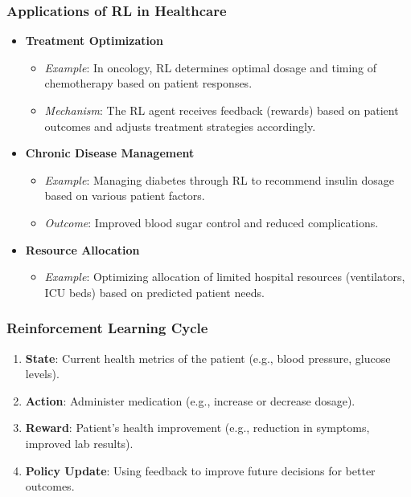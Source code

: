 \documentclass[aspectratio=169]{beamer}
\begin{document}
\begin{frame}[fragile]
  \frametitle{Applications of RL in Healthcare}
  \begin{itemize}
    \item \textbf{Treatment Optimization}
      \begin{itemize}
        \item \textit{Example}: In oncology, RL determines optimal dosage and timing of chemotherapy based on patient responses.
        \item \textit{Mechanism}: The RL agent receives feedback (rewards) based on patient outcomes and adjusts treatment strategies accordingly.
      \end{itemize}
    
    \item \textbf{Chronic Disease Management}
      \begin{itemize}
        \item \textit{Example}: Managing diabetes through RL to recommend insulin dosage based on various patient factors.
        \item \textit{Outcome}: Improved blood sugar control and reduced complications.
      \end{itemize}
    
    \item \textbf{Resource Allocation}
      \begin{itemize}
        \item \textit{Example}: Optimizing allocation of limited hospital resources (ventilators, ICU beds) based on predicted patient needs.
      \end{itemize}
  \end{itemize}
\end{frame}

\begin{frame}[fragile]
  \frametitle{Reinforcement Learning Cycle}
  \begin{enumerate}
    \item \textbf{State}: Current health metrics of the patient (e.g., blood pressure, glucose levels).
    \item \textbf{Action}: Administer medication (e.g., increase or decrease dosage).
    \item \textbf{Reward}: Patient's health improvement (e.g., reduction in symptoms, improved lab results).
    \item \textbf{Policy Update}: Using feedback to improve future decisions for better outcomes.
  \end{enumerate}
\end{frame}
\end{document}
